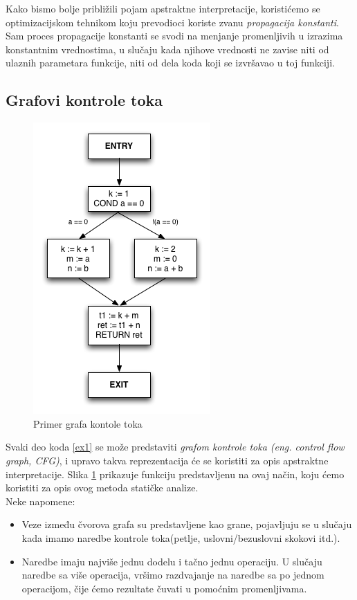 Kako bismo bolje približili pojam apstraktne interpretacije, koristićemo se
optimizacijskom tehnikom koju prevodioci koriste zvanu \emph{propagacija konstanti}.
Sam proces propagacije konstanti se svodi na menjanje promenljivih u izrazima
konstantnim vrednostima, u slučaju kada njihove vrednosti ne zavise niti od
ulaznih parametara funkcije, niti od dela koda koji se izvršavao u toj funkciji.


\subsection{Grafovi kontrole toka}
\label{subsec:cfgs}

\begin{figure}[H]
\begin{center}
\includegraphics[scale=0.5]{Treehydra-cfg.png}
\end{center}
\caption{Primer grafa kontole toka}
\label{fig:graf}
\end{figure}

Svaki deo koda \ref{ex1} se može predstaviti \emph{grafom kontrole toka (eng. control flow graph, CFG)},
i upravo takva reprezentacija će se koristiti za opis apstraktne interpretacije.
Slika \ref{fig:graf} prikazuje funkciju predstavljenu na ovaj način, koju ćemo koristiti za
opis ovog metoda statičke analize.\\
Neke napomene:
\begin{itemize}
\item Veze između čvorova grafa su predstavljene kao grane, pojavljuju se u slučaju
kada imamo naredbe kontrole toka(petlje, uslovni/bezuslovni skokovi itd.).
\item Naredbe imaju najviše jednu dodelu i tačno jednu operaciju. U slučaju naredbe
sa više operacija, vršimo razdvajanje na naredbe sa po jednom operacijom, čije
ćemo rezultate čuvati u pomoćnim promenljivama.
\end{itemize}

